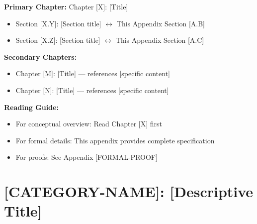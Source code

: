 
\begin{tcolorbox}[colback=purple!5!white, colframe=purple!75!black, 
    title=Chapter Linkage]

\textbf{Primary Chapter:} Chapter [X]: [Title]
\begin{itemize}[nosep]
\item Section [X.Y]: [Section title] $\leftrightarrow$ This Appendix Section [A.B]
\item Section [X.Z]: [Section title] $\leftrightarrow$ This Appendix Section [A.C]
\end{itemize}

\textbf{Secondary Chapters:}
\begin{itemize}[nosep]
\item Chapter [M]: [Title] --- references [specific content]
\item Chapter [N]: [Title] --- references [specific content]
\end{itemize}

\textbf{Reading Guide:}
\begin{itemize}[nosep]
\item For conceptual overview: Read Chapter [X] first
\item For formal details: This appendix provides complete specification
\item For proofs: See Appendix [FORMAL-PROOF]
\end{itemize}

\end{tcolorbox}


\chapter{[CATEGORY-NAME]: [Descriptive Title]}
\label{app:[short-label]}


\begin{abstract}
[Maximum 100 words describing:]
- What question this appendix answers
- What the main contribution is
- How it connects to EBF
\end{abstract}

